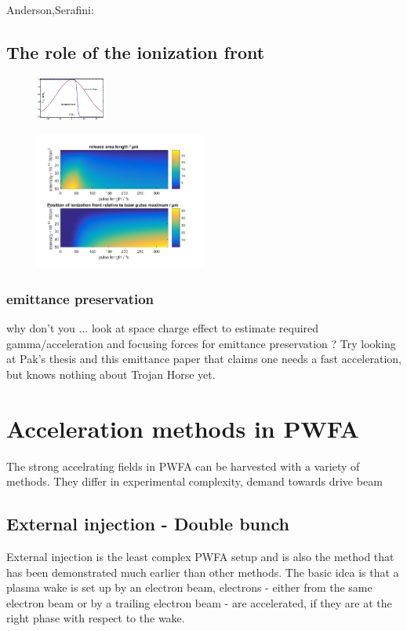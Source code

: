 Anderson,Serafini:\cite{AndersonVelocBunchPPRSTAB2005,serafini2001velocity}
\subsection{The role of the ionization front}

\begin{figure}
\includegraphics[width=0.2\textwidth]{theory/images/raw/Ionization_front.png}
\end{figure}


\begin{figure}
\begin{center}
\includegraphics[width=0.5\textwidth]{theory/images/edited/IonFrontVariation.pdf}
\end{center}
\end{figure}



\subsubsection{emittance preservation}
why don't you ... look at space charge effect to estimate required gamma/acceleration and focusing forces for emittance preservation ? Try looking at Pak's thesis and this emittance paper that claims one needs a fast acceleration, but knows nothing about Trojan Horse yet.
\section{Acceleration methods in PWFA}
The strong accelrating fields in PWFA can be harvested with a variety of methods. They differ in experimental complexity, demand towards drive beam 



\subsection{External injection - Double bunch}
External injection is the least complex PWFA setup and is also the method that has been demonstrated much earlier than other methods. The basic idea is that a plasma wake is set up by an electron beam, electrons - either from the same electron beam or by a trailing electron beam - are accelerated, if they are at the right phase with respect to the wake.


